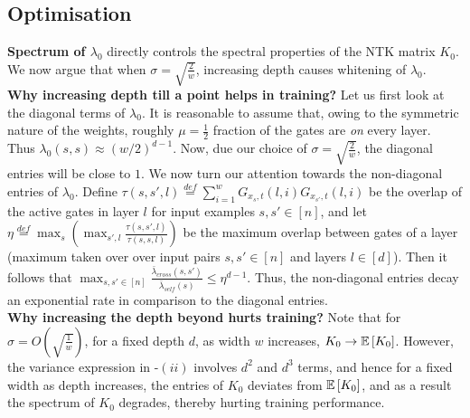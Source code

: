 \subsection{Optimisation}
\textbf{Spectrum of $\lambda_0$} directly controls the spectral properties of the NTK matrix $K_0$.  We now argue that when $\sigma=\sqrt{\frac{2}{w}}$, increasing depth causes whitening of $\lambda_0$.\\%
\textbf{Why increasing depth till a point helps in training? } Let us first look at the diagonal terms of $\lambda_0$. It is reasonable to assume that, owing to the symmetric nature of the weights, roughly $\mu=\frac{1}{2}$ fraction of the gates are \emph{on} every layer. Thus $\lambda_0(s,s)\approx (w/2)^{d-1}$. Now, due our choice of $\sigma=\sqrt{\frac{2}{w}}$, the diagonal entries will be close to $1$. We now turn our attention towards the non-diagonal entries of $\lambda_0$. Define $\tau(s,s',l)\stackrel{def}=\sum_{i=1}^w G_{x_s,t}(l,i)G_{x_{s'},t}(l,i)$ be the overlap of the active gates in layer $l$ for input examples $s,s'\in[n]$, and  let $\eta\stackrel{def}=\max_s\left(\max_{s',l} \frac{\tau(s,s',l)}{\tau(s,s,l)}\right)$ be the maximum overlap between gates of a layer (maximum taken over over input pairs $s,s'\in[n]$ and layers $l\in [d]$).  Then it follows that $\max_{s,s'\in [n]} \frac{\bar{\lambda}_{cross}(s,s')}{\bar{\lambda}_{self}(s)}\leq \eta^{d-1}$. Thus, the non-diagonal entries decay an exponential rate in comparison to the diagonal entries.\hfill\\
\textbf{Why increasing the depth beyond hurts training?} Note that for $\sigma=O\left(\sqrt{\frac{1}{w}}\right)$, for a fixed depth $d$, as width $w$ increases, $K_0\rightarrow\mathbb{E}\left[K_0\right]$. However, the variance expression in -$(ii)$ involves $d^2$ and $d^3$ terms, and hence for a fixed width as depth increases, the entries of $K_0$ deviates from $\mathbb{E}\left[K_0\right]$, and as a result the spectrum of $K_0$ degrades, thereby hurting training performance.\\
